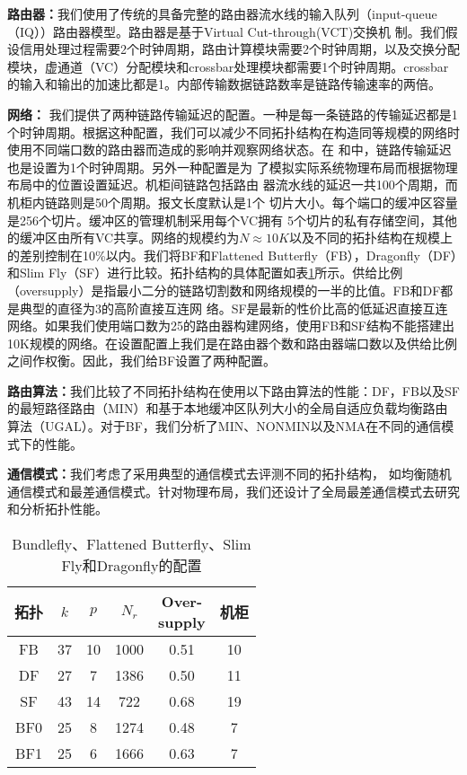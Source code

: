 \textbf{路由器：}我们使用了传统的具备完整的路由器流水线的输入队列（input-queue （IQ））路由器模型。路由器是基于Virtual Cut-through(VCT)交换机
制。我们假设信用处理过程需要2个时钟周期，路由计算模块需要2个时钟周期，以及交换分配模块，虚通道（VC）分配模块和crossbar处理模块都需要1个时钟周期。crossbar的输入和输出的加速比都是1。内部传输数据链路数率是链路传输速率的两倍。

\textbf{网络：} 我们提供了两种链路传输延迟的配置。一种是每一条链路的传输延迟都是1个时钟周期。根据这种配置，我们可以减少不同拓扑结构在构造同等规模的网络时使用不同端口数的路由器而造成的影响并观察网络状态。在
和中，链路传输延迟也是设置为1个时钟周期。另外一种配置是为
了模拟实际系统物理布局而根据物理布局中的位置设置延迟。机柜间链路包括路由
器流水线的延迟一共100个周期，而机柜内链路则是50个周期。报文长度默认是1个
切片大小。每个端口的缓冲区容量是256个切片。缓冲区的管理机制采用每个VC拥有
5个切片的私有存储空间，其他的缓冲区由所有VC共享。网络的规模约为$N\approx10K$以及不同的拓扑结构在规模上的差别控制在10\%以内。我们将BF和Flattened Butterfly（FB），Dragonfly（DF）和Slim Fly（SF）进行比较。拓扑结构的具体配置如表\ref{Table6}所示。供给比例（oversupply）是指最小二分的链路切割数和网络规模的一半的比值。FB和DF都是典型的直径为3的高阶直接互连网
络。SF是最新的性价比高的低延迟直接互连网络。如果我们使用端口数为25的路由器构建网络，使用FB和SF结构不能搭建出10K规模的网络。在设置配置上我们是在路由器个数和路由器端口数以及供给比例之间作权衡。因此，我们给BF设置了两种配置。

\textbf{路由算法：}我们比较了不同拓扑结构在使用以下路由算法的性能：DF，FB以及SF的最短路径路由（MIN）和基于本地缓冲区队列大小的全局自适应负载均衡路由算法（UGAL）。对于BF，我们分析了MIN、NONMIN以及NMA在不同的通信模式下的性能。

\textbf{通信模式：}我们考虑了采用典型的通信模式去评测不同的拓扑结构，
如均衡随机通信模式和最差通信模式。针对物理布局，我们还设计了全局最差通信模式去研究和分析拓扑性能。

\begin{table}[t]
 \centering
\caption{Bundlefly、Flattened Butterfly、Slim Fly和Dragonfly的配置}
\centering
\begin{tabular}{c| c| c|c|c| c }\hline
  \centering
  拓扑	& $k$ &$p$ & $N_r$ &\tabincell{c}{Over-\\supply} & 机柜  \\\hline
  FB &37 &10	   &1000	&0.51 &10 	 \\\hline
  DF &27 &7	&1386	&0.50 &11	  \\\hline
  SF &43 &14 	&722	&0.68 &19  	 \\\hline
  BF0 &25 &8 	&1274 	&0.48 &7	\\\hline
  BF1 &25 &6 	&1666 	&0.63 &7   \\\hline
\end{tabular}
\label{Table6}
 \end{table}


